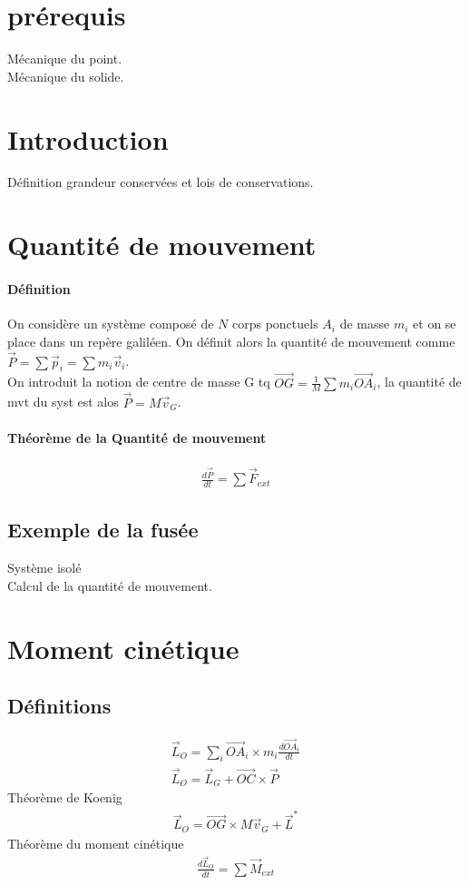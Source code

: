 \documentclass[12pt,prb,aps,epsf]{report}
\begin{document}
\section{prérequis}
Mécanique  du point.\\
Mécanique du solide.

\section{Introduction}
Définition grandeur conservées et lois de conservations.
\section{Quantité de mouvement}
\paragraph{Définition} On considère un système composé de $N$ corps ponctuels $A_i$ de masse $m_i$ et on se place dans un repère galiléen. On définit alors la quantité de mouvement comme $\vec{P}=\sum \vec{p}_i = \sum m_i\vec{v}_i$.\\
On introduit la notion de centre de masse G tq $\vec{OG} = \frac{1}{M}\sum m_i\vec{OA}_i$, la quantité de mvt du syst est alos $\vec{P} = M\vec{v}_G$.\\
\paragraph{Théorème de la Quantité de mouvement}
\begin{eqnarray}
\frac{d\vec{P}}{dt}=\sum\vec{F}_{ext}
\end{eqnarray}
\subsection{Exemple de la fusée}
Système isolé\\
Calcul de la quantité de mouvement.\\

\section{Moment cinétique}
\subsection{Définitions}
\begin{eqnarray}
\vec{L}_O = \sum_i \vec{OA}_i \times m_i\frac{d\vec{OA}_i}{dt}\\
\vec{L}_O = \vec{L}_G + \vec{OC} \times \vec{P}
\end{eqnarray}
Théorème de Koenig 
\begin{eqnarray}
\vec{L}_O = \vec{OG}\times M\vec{v}_G + \vec{L}^*
\end{eqnarray}
Théorème du moment cinétique
\begin{eqnarray}
\frac{d\vec{L}_O}{dt}  = \sum\vec{M}_{ext}
\end{eqnarray}
\end{document}
